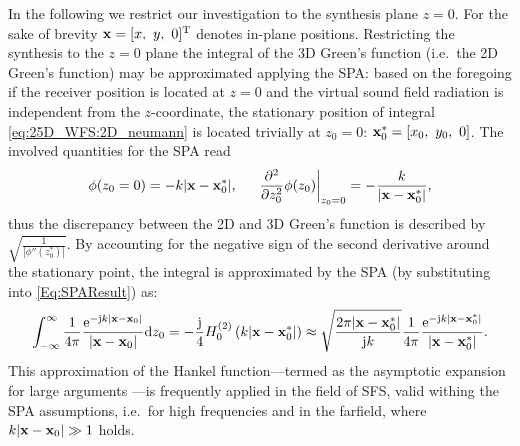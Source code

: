 \vspace{3mm}
In the following we restrict our investigation to the synthesis plane $z=0$.
For the sake of brevity $\vx = [x,\ y,\ 0]^{\mathrm{T}}$ denotes in-plane positions.
Restricting the synthesis to the $z=0$ plane the integral of the 3D Green's function (i.e.\ the 2D Green's function) may be approximated applying the SPA: based on the foregoing if the receiver position is located at $z=0$ and the virtual sound field radiation is independent from the $z$-coordinate, the stationary position of integral \eqref{eq:25D_WFS:2D_neumann} is located trivially at $z_0=0$: $\mathbf{x}_0^* = [x_0,\ y_0,\ 0]$.
The involved quantities for the SPA read
\begin{equation}
\phi(z_0=0) = -k|\mathbf{x}-\mathbf{x}_0^*|, \hspace{5mm} \left.
\frac{\partial^2}{\partial z_0^2} \phi(z_0)\right|_{z_0=0} = -\frac{k}{|\mathbf{x}-\mathbf{x}_0^*|},
\end{equation}
thus the discrepancy between the 2D and 3D Green's function is described by $ \sqrt{\frac{1}{ |\phi''(z_0^*) | }}$.
By accounting for the negative sign of the second derivative around the stationary point, the integral is approximated by the SPA (by substituting into \eqref{Eq:SPAResult}) as:
\begin{equation}
\int_{-\infty}^{\infty} \frac{1}{4\pi} \frac{\mathrm{e}^{-\mathrm{j} k |\mathbf{x}-\mathbf{x}_0| }}{|\mathbf{x}-\mathbf{x}_0|}\mathrm{d} z_0 = -\frac{\mathrm{j}}{4} H_0^{(2)}\left( k|\mathbf{x}-\mathbf{x}_0^*| \right) \approx 
\sqrt{\frac{2\pi |\mathbf{x}-\mathbf{x}_0^*|}{\mathrm{j} k}} \frac{1}{4\pi}  \frac{\mathrm{e}^{-\mathrm{j} k |\mathbf{x}-\mathbf{x}_0^*| }}{|\mathbf{x}-\mathbf{x}_0^*|}.
\label{Eq:25D_WFS:Hankel_approx}
\end{equation}
This approximation of the Hankel function---termed as the asymptotic expansion for large arguments \cite[(10.2.6)]{Nist2010}---is frequently applied in the field of SFS, valid withing the SPA assumptions, i.e.\ for high frequencies and in the farfield, where $k|\mathbf{x}-\mathbf{x}_0|\gg 1$ holds.

